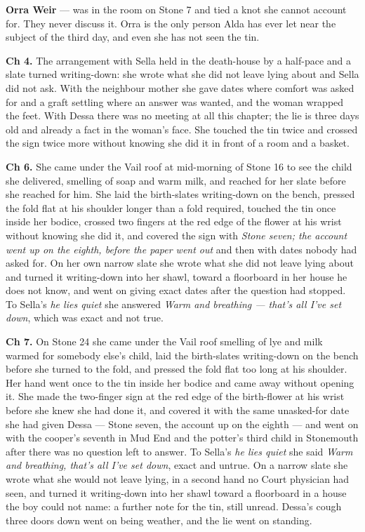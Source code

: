\documentclass{design/chronicle}
\begin{document}
{\textbf{Orra Weir} — was in the room on Stone 7 and tied a knot she cannot account for. They never discuss it. Orra is the only person Alda has ever let near the subject of the third day, and even she has not seen the tin.

\textbf{Ch 4.} The arrangement with Sella held in the death-house by a half-pace and a slate turned writing-down: she wrote what she did not leave lying about and Sella did not ask. With the neighbour mother she gave dates where comfort was asked for and a graft settling where an answer was wanted, and the woman wrapped the feet. With Dessa there was no meeting at all this chapter; the lie is three days old and already a fact in the woman’s face. She touched the tin twice and crossed the sign twice more without knowing she did it in front of a room and a basket.

\textbf{Ch 6.} She came under the Vail roof at mid-morning of Stone 16 to see the child she delivered, smelling of soap and warm milk, and reached for her slate before she reached for him. She laid the birth-slates writing-down on the bench, pressed the fold flat at his shoulder longer than a fold required, touched the tin once inside her bodice, crossed two fingers at the red edge of the flower at his wrist without knowing she did it, and covered the sign with \emph{Stone seven; the account went up on the eighth, before the paper went out} and then with dates nobody had asked for. On her own narrow slate she wrote what she did not leave lying about and turned it writing-down into her shawl, toward a floorboard in her house he does not know, and went on giving exact dates after the question had stopped. To Sella’s \emph{he lies quiet} she answered \emph{Warm and breathing --- that’s all I’ve set down}, which was exact and not true.

\textbf{Ch 7.} On Stone 24 she came under the Vail roof smelling of lye and milk warmed for somebody else’s child, laid the birth-slates writing-down on the bench before she turned to the fold, and pressed the fold flat too long at his shoulder. Her hand went once to the tin inside her bodice and came away without opening it. She made the two-finger sign at the red edge of the birth-flower at his wrist before she knew she had done it, and covered it with the same unasked-for date she had given Dessa --- Stone seven, the account up on the eighth --- and went on with the cooper’s seventh in Mud End and the potter’s third child in Stonemouth after there was no question left to answer. To Sella’s \emph{he lies quiet} she said \emph{Warm and breathing, that’s all I’ve set down}, exact and untrue. On a narrow slate she wrote what she would not leave lying, in a second hand no Court physician had seen, and turned it writing-down into her shawl toward a floorboard in a house the boy could not name: a further note for the tin, still unread. Dessa’s cough three doors down went on being weather, and the lie went on standing.

}
\end{document}
